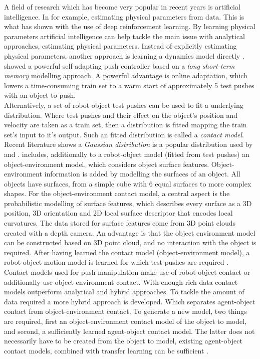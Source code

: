 A field of research which has become very popular in recent years is artificial intelligence. In for example, estimating physical parameters from data. This is what \cite{denil_learning_2017} has shown with the use of deep reinforcement learning. By learning physical parameters artificial intelligence can help tackle the main issue with analytical approaches, estimating physical parameters. Instead of explicitly estimating physical parameters, another approach is learning a dynamics model directly \cite{stuber_lets_2020}. \cite{cong_self-adapting_2020} showed a powerful self-adapting push controller based on a \textit{long short-term memory} modelling approach. A powerful advantage is online adaptation, which lowers a time-consuming train set to a warm start of approximately 5 test pushes with an object to push. \\

Alternatively, a set of robot-object test pushes can be used to fit a underlying distribution. Where test pushes and their effect on the object's position and velocity are taken as a train set, then a distribution is fitted mapping the train set's input to it's output. Such an fitted distribution is called a \textit{contact model}. Recent literature shows a \textit{Gaussian distribution} is a popular distribution used by \cite{mericli_push-manipulation_2015} and \cite{stuber_feature-based_2018}. \cite{stuber_feature-based_2018} includes, additionally to a robot-object model (fitted from test pushes) an object-environment model, which considers object surface features. Object-environment information is added by modelling the surfaces of an object. All objects have surfaces, from a simple cube with 6 equal surfaces to more complex shapes. For the object-environment contact model, a central aspect is the probabilistic modelling of surface features, which describes every surface as a 3D position, 3D orientation and 2D local surface descriptor that encodes local curvatures. The data stored for surface features come from 3D point clouds created with a depth camera. An advantage is that the object environment model can be constructed based on 3D point cloud, and no interaction with the object is required. After having learned the contact model (object-environment model), a robot-object motion model is learned for which test pushes are required \cite{stuber_feature-based_2018}. \\

Contact models used for push manipulation make use of robot-object contact or additionally use object-environment contact. With enough rich data contact models outperform analytical and hybrid approaches. To tackle the amount of data required a more hybrid approach is developed. Which separates agent-object contact from object-environment contact. To generate a new model, two things are required, first an object-environment contact model of the object to model, and second, a sufficiently learned agent-object contact model. The latter does not necessarily have to be created from the object to model, existing agent-object contact models, combined with transfer learning can be sufficient \cite{kopicki_learning_2017}. \\

